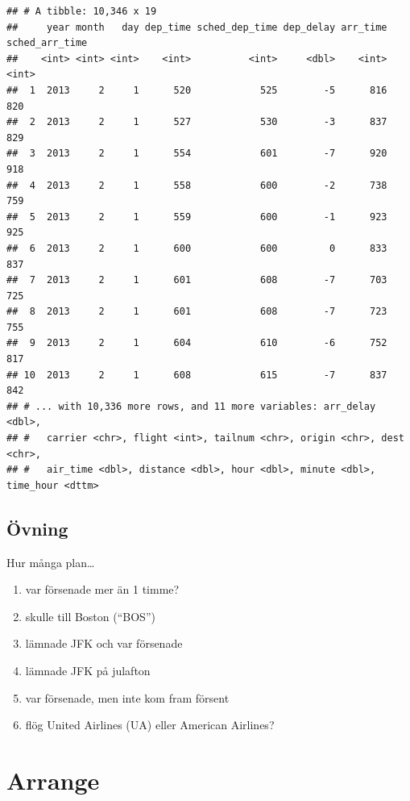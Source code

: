 \documentclass[
]{book}
\providecommand{\tightlist}{%
  \setlength{\itemsep}{0pt}\setlength{\parskip}{0pt}}
\begin{document}
\begin{verbatim}
## # A tibble: 10,346 x 19
##     year month   day dep_time sched_dep_time dep_delay arr_time sched_arr_time
##    <int> <int> <int>    <int>          <int>     <dbl>    <int>          <int>
##  1  2013     2     1      520            525        -5      816            820
##  2  2013     2     1      527            530        -3      837            829
##  3  2013     2     1      554            601        -7      920            918
##  4  2013     2     1      558            600        -2      738            759
##  5  2013     2     1      559            600        -1      923            925
##  6  2013     2     1      600            600         0      833            837
##  7  2013     2     1      601            608        -7      703            725
##  8  2013     2     1      601            608        -7      723            755
##  9  2013     2     1      604            610        -6      752            817
## 10  2013     2     1      608            615        -7      837            842
## # ... with 10,336 more rows, and 11 more variables: arr_delay <dbl>,
## #   carrier <chr>, flight <int>, tailnum <chr>, origin <chr>, dest <chr>,
## #   air_time <dbl>, distance <dbl>, hour <dbl>, minute <dbl>, time_hour <dttm>
\end{verbatim}

\hypertarget{uxf6vning}{%
\subsection{Övning}\label{uxf6vning}}

Hur många plan\ldots{}

\begin{enumerate}
\def\labelenumi{\arabic{enumi}.}
\tightlist
\item
  var försenade mer än 1 timme?
\item
  skulle till Boston (``BOS'')
\item
  lämnade JFK och var försenade
\item
  lämnade JFK på julafton
\item
  var försenade, men inte kom fram försent
\item
  flög United Airlines (UA) eller American Airlines?
\end{enumerate}

\hypertarget{arrange}{%
\section{Arrange}\label{arrange}}
\end{document}
